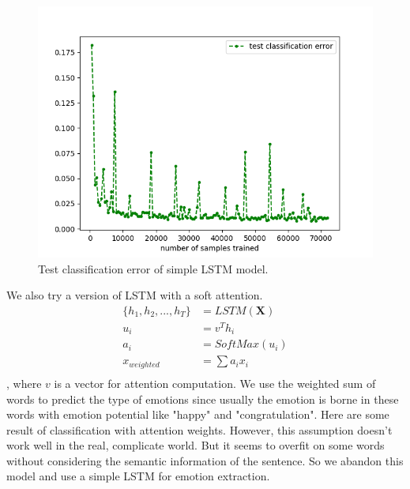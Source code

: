 \documentclass{article}
\begin{document}
\begin{figure}[h]
\begin{center}
\includegraphics[scale=0.6]{Figure2.png}
\caption{Test classification error of simple LSTM model.}
\label{fig:test error}
\end{center}
\end{figure}

We also try a version of LSTM with a soft attention. 
\begin{align*}
\{h_1, h_2,..., h_T\} &= LSTM(\mathbf{X})\\
u_i &= v^{T}h_i\\
a_i &= SoftMax(u_i)\\
x_{weighted} &= \sum a_i x_i\\
\end{align*}
, where $v$ is a vector for attention computation. We use the weighted sum of words to predict the type of emotions since usually the emotion is borne in these words with emotion potential like "happy" and "congratulation". Here are some result of classification with attention weights. However, this assumption doesn't work well in the real, complicate world. But it seems to overfit on some words without considering the semantic information of the sentence. So we abandon this model and use a simple LSTM for emotion extraction.
\end{document}
